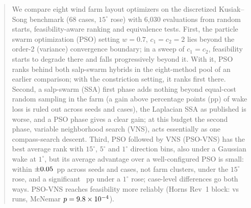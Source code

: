 \begin{frontmatter}
\begin{abstract}
We compare eight wind farm layout optimizers on the discretized Kusiak--Song benchmark (68 cases, $15^\circ$ rose) with 6,030 evaluations from random starts, feasibility-aware ranking and equivalence tests. First, the particle swarm optimization (PSO) setting $w=0.7$, $c_1=c_2=2$ lies beyond the order-2 (variance) convergence boundary; in a sweep of $c_1=c_2$, feasibility starts to degrade there and falls progressively beyond it. With it, PSO ranks behind both salp-swarm hybrids in the eight-method pool of an earlier comparison; with the constriction setting, it ranks first there. Second, a salp-swarm (SSA) first phase adds nothing beyond equal-cost random sampling in the farm (a gain above \NEqMargin{} percentage points (pp) of wake loss is ruled out across seeds and cases), the Laplacian SSA as published is worse, and a PSO phase gives a clear gain; at this budget the second phase, variable neighborhood search (VNS), acts essentially as one compass-search descent. Third, PSO followed by VNS (PSO-VNS) has the best average rank with $15^\circ$, $5^\circ$ and $1^\circ$ direction bins, also under a Gaussian wake at $1^\circ$, but its average advantage over a well-configured PSO is small: within $\pm\NEqMargin$~pp across seeds and cases, not farm clusters, under the $15^\circ$ rose, and a significant \NFPairMeanOne~pp under a $1^\circ$ rose; case-level differences go both ways. PSO-VNS reaches feasibility more reliably (Horns Rev~1 block: \NHRFeasPSOVNS{} vs \NHRFeasPSO{} runs, McNemar $p=\NXHRMcNemarP$).

\end{abstract}
\end{frontmatter}
